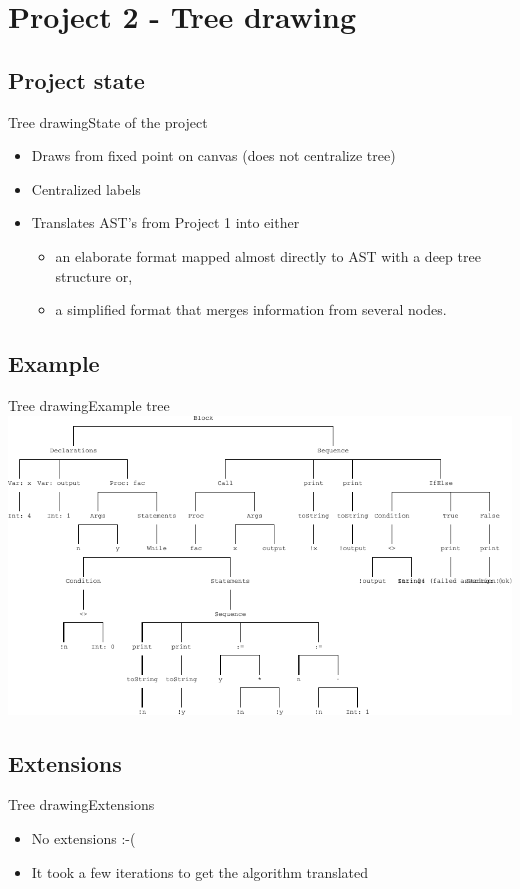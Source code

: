 \documentclass{beamer}
\begin{document}
\section{Project 2 - Tree drawing}
\subsection{Project state}
\begin{frame}{Tree drawing}{State of the project}
  \begin{itemize}
  \item {
    Draws from fixed point on canvas (does not centralize tree)
  }
  \item {
    Centralized labels
  }
  \item {
    Translates AST's from Project 1 into either
      \begin{itemize}
        \item an elaborate format mapped almost directly to AST with a deep tree structure or,
        \item a simplified format that merges information from several nodes.
     \end{itemize}       
  }
  \end{itemize}
\end{frame}


\subsection{Example}
\begin{frame}{Tree drawing}{Example tree}
\includegraphics[width=1.00\textwidth]{treeprint_example}
\end{frame}

\subsection{Extensions}
\begin{frame}{Tree drawing}{Extensions}
  \begin{itemize}
  \item {
    No extensions :-(
  }
  \pause
  \item {
    It took a few iterations to get the algorithm translated
  }
  \end{itemize}
\end{frame}
\end{document}
